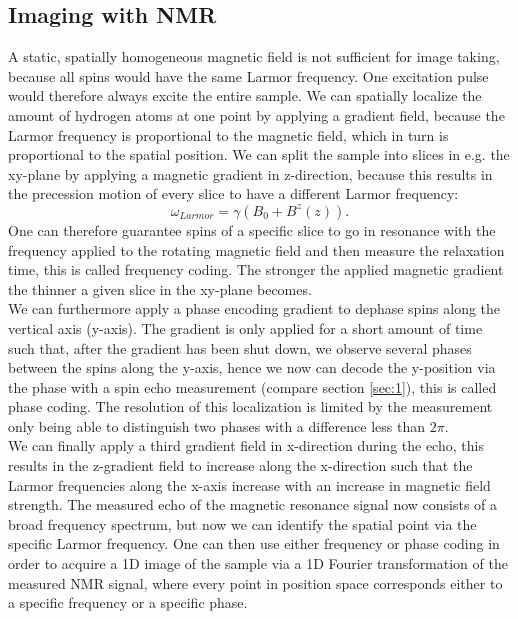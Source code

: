 \subsection{Imaging with NMR}
\label{sec:3}
A static, spatially homogeneous magnetic field is not sufficient for image taking, because all spins would have the same Larmor frequency. One excitation pulse would therefore always excite the entire sample. We can spatially localize the amount of hydrogen atoms at one point by applying a gradient field, because the Larmor frequency is proportional to the magnetic field, which in turn is proportional to the spatial position.
We can split the sample into slices in e.g. the xy-plane by applying a magnetic gradient in z-direction, because this results in the precession motion of every slice to have a different Larmor frequency:
\begin{equation}
	\omega _{Larmor} = \gamma \left(B_0+ B^z (z)\right)\mathrm{.}
	\label{eq:4}
\end{equation}
One can therefore guarantee spins of a specific slice to go in resonance with the frequency applied to the rotating magnetic field and then measure the relaxation time, this is called frequency coding. The stronger the applied magnetic gradient the thinner a given slice in the xy-plane becomes.\\
We can furthermore apply a phase encoding gradient to dephase spins along the vertical axis (y-axis). The gradient is only applied for a short amount of time such that, after the gradient has been shut down, we observe several phases between the spins along the y-axis, hence we now can decode the y-position via the phase with a spin echo measurement (compare section \ref{sec:1}), this is called phase coding. The resolution of this localization is limited by the measurement only being able to distinguish two phases with a difference less than $2 \pi$.\\
We can finally apply a third gradient field in x-direction during the echo, this results in the z-gradient field to increase along the x-direction such that the Larmor frequencies along the x-axis increase with an increase in magnetic field strength. The measured echo of the magnetic resonance signal now consists of a broad frequency spectrum, but now we can identify the spatial point via the specific Larmor frequency. One can then use either frequency or phase coding in order to acquire a 1D image of the sample via a 1D Fourier transformation of the measured NMR signal, where every point in position space corresponds either to a specific frequency or a specific phase.\\
